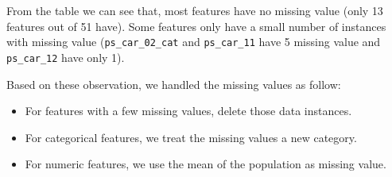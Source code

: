 \documentclass{standalone}
\begin{document}
From the table we can see that, most features have no missing value (only 13 features out of 51 have).
Some features only have a small number of instances with missing value (\lstinline{ps_car_02_cat} and \lstinline{ps_car_11} have 5 missing value and \lstinline{ps_car_12} have only 1).

Based on these observation, we handled the missing values as follow:

\begin{itemize}
    \item For features with a few missing values, delete those data instances.
    \item For categorical features, we treat the missing values a new category.
    \item For numeric features, we use the mean of the population as missing value.
\end{itemize}
\end{document}
